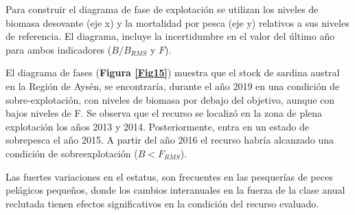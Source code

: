 \documentclass[
  spanish,
]{article}
\begin{document}
Para construir el diagrama de fase de explotación se utilizan los
niveles de biomasa desovante (eje x) y la mortalidad por pesca (eje y)
relativos a sus niveles de referencia. El diagrama, incluye la
incertidumbre en el valor del último año para ambos indicadores
(\(B/B_{RMS}\) y \(F\)).

El diagrama de fases (\textbf{Figura \ref{Fig15}}) muestra que el stock
de sardina austral en la Región de Aysén, se encontraría, durante el año
2019 en una condición de sobre-explotación, con niveles de biomasa por
debajo del objetivo, aunque con bajos niveles de F. Se observa que el
recurso se localizó en la zona de plena explotación los años 2013 y
2014. Posteriormente, entra en un estado de sobrepesca el año 2015. A
partir del año 2016 el recurso habría alcanzado una condición de
sobreexplotación (\(B<F_{RMS}\)).

Las fuertes variaciones en el estatus, son frecuentes en las pesquerías
de peces pelágicos pequeños, donde los cambios interanuales en la fuerza
de la clase anual reclutada tienen efectos significativos en la
condición del recurso evaluado.

\pagebreak

\small
\end{document}
